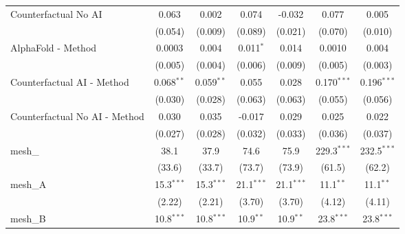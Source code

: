 \begin{tabular}{lcccccc}
   Counterfactual No AI                                        & 0.063          & 0.002         & 0.074          & -0.032         & 0.077         & 0.005\\   
                                                               & (0.054)        & (0.009)       & (0.089)        & (0.021)        & (0.070)       & (0.010)\\   
   AlphaFold - Method                                          & 0.0003         & 0.004         & 0.011$^{*}$    & 0.014          & 0.0010        & 0.004\\   
                                                               & (0.005)        & (0.004)       & (0.006)        & (0.009)        & (0.005)       & (0.003)\\   
   Counterfactual AI - Method                                  & 0.068$^{**}$   & 0.059$^{**}$  & 0.055          & 0.028          & 0.170$^{***}$ & 0.196$^{***}$\\   
                                                               & (0.030)        & (0.028)       & (0.063)        & (0.063)        & (0.055)       & (0.056)\\   
   Counterfactual No AI - Method                               & 0.030          & 0.035         & -0.017         & 0.029          & 0.025         & 0.022\\   
                                                               & (0.027)        & (0.028)       & (0.032)        & (0.033)        & (0.036)       & (0.037)\\   
   mesh\_                                                      & 38.1           & 37.9          & 74.6           & 75.9           & 229.3$^{***}$ & 232.5$^{***}$\\   
                                                               & (33.6)         & (33.7)        & (73.7)         & (73.9)         & (61.5)        & (62.2)\\   
   mesh\_A                                                     & 15.3$^{***}$   & 15.3$^{***}$  & 21.1$^{***}$   & 21.1$^{***}$   & 11.1$^{**}$   & 11.1$^{**}$\\   
                                                               & (2.22)         & (2.21)        & (3.70)         & (3.70)         & (4.12)        & (4.11)\\   
   mesh\_B                                                     & 10.8$^{***}$   & 10.8$^{***}$  & 10.9$^{**}$    & 10.9$^{**}$    & 23.8$^{***}$  & 23.8$^{***}$\\   

\end{tabular}
